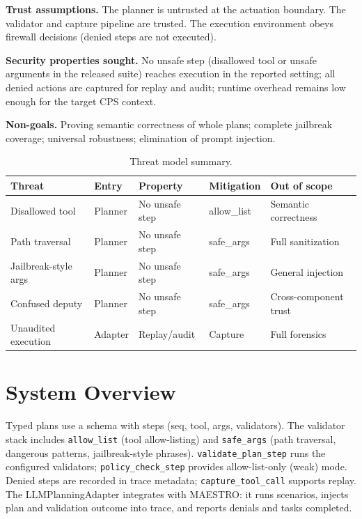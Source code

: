 \documentclass[sigconf]{acmart}
\begin{document}
\textbf{Trust assumptions.} The planner is untrusted at the actuation boundary. The validator and capture pipeline are trusted. The execution environment obeys firewall decisions (denied steps are not executed).

\textbf{Security properties sought.} No unsafe step (disallowed tool or unsafe arguments in the released suite) reaches execution in the reported setting; all denied actions are captured for replay and audit; runtime overhead remains low enough for the target CPS context.

\textbf{Non-goals.} Proving semantic correctness of whole plans; complete jailbreak coverage; universal robustness; elimination of prompt injection.

\begin{table}[t]
\caption{Threat model summary.}
\label{tab:threat}
\centering
\small
\begin{tabular}{@{}lllll@{}}
\hline
Threat & Entry & Property & Mitigation & Out of scope \\
\hline
Disallowed tool & Planner & No unsafe step & allow\_list & Semantic correctness \\
Path traversal & Planner & No unsafe step & safe\_args & Full sanitization \\
Jailbreak-style args & Planner & No unsafe step & safe\_args & General injection \\
Confused deputy & Planner & No unsafe step & safe\_args & Cross-component trust \\
Unaudited execution & Adapter & Replay/audit & Capture & Full forensics \\
\hline
\end{tabular}
\end{table}

\section{System Overview}

Typed plans use a schema with steps (seq, tool, args, validators). The validator stack includes \texttt{allow\_list} (tool allow-listing) and \texttt{safe\_args} (path traversal, dangerous patterns, jailbreak-style phrases). \texttt{validate\_plan\_step} runs the configured validators; \texttt{policy\_check\_step} provides allow-list-only (weak) mode. Denied steps are recorded in trace metadata; \texttt{capture\_tool\_call} supports replay. The LLMPlanningAdapter integrates with MAESTRO: it runs scenarios, injects plan and validation outcome into trace, and reports denials and tasks completed.
\end{document}
